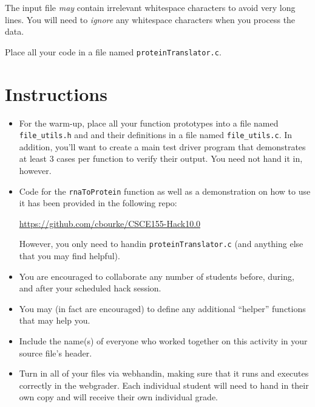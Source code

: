 \documentclass[12pt]{scrartcl}
\begin{document}
The input file \emph{may} contain irrelevant whitespace characters to
avoid very long lines.  You will need to \emph{ignore} any whitespace
characters when you process the data.  

Place all your code in a file named \texttt{proteinTranslator.c}.

\section*{Instructions}

\begin{itemize}

  \item For the warm-up, place all your function prototypes into a file 
  named \texttt{file_utils.h} and and their definitions in a
  file named \texttt{file_utils.c}.  In addition, you'll want
  to create a main test driver program that demonstrates at least 3 cases 
  per function to verify their output.  You need not hand it in, however.
  
  \item Code for the \texttt{rnaToProtein} function as well as 
  a demonstration on how to use it has been provided in the following repo:

  \url{https://github.com/cbourke/CSCE155-Hack10.0}

  However, you only need to handin \texttt{proteinTranslator.c}
  (and anything else that you may find helpful).

  \item You are encouraged to collaborate any number of students 
  before, during, and after your scheduled hack session.  

  \item You may (in fact are encouraged) to define any additional
  ``helper'' functions that may help you.

  \item Include the name(s) of everyone who worked together on
  this activity in your source file's header.

  \item Turn in all of your files via webhandin, making sure that 
  it runs and executes correctly in the webgrader.  Each individual 
  student will need to hand in their own copy and will receive 
  their own individual grade.
\end{itemize}  
\end{document}
